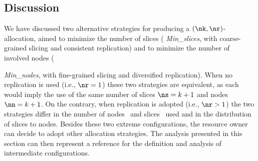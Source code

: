 \subsection{Discussion}
We have discussed two alternative strategies for producing a
$(\nk,\nr)$-allocation, aimed to minimize the number of slices ({\em
  Min\_slices\/}, with coarse-grained slicing and consistent
replication) and to minimize the number of involved nodes ({{\em
    Min\_nodes\/}, with fine-grained slicing and diversified
  replication).  When no replication is used (i.e., $\nr=1$) these two
  strategies are equivalent, as each would imply the use of the same
  number of slices $\ns=k+1$ and nodes $\nn=k+1$. On the contrary,
  when replication is adopted (i.e., $\nr>1$) the two strategies
  differ in the number of nodes \nn\ and slices \ns\ used and in the
  distribution of slices to nodes. Besides these two extreme
  configurations, the resource owner can decide to adopt other
  allocation strategies. The analysis presented in this section can
  then represent a reference for the definition and analysis of
  intermediate configurations.

}

